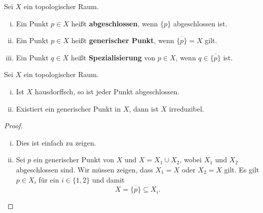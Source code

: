 \begin{defn}
	Sei $X$ ein topologischer Raum.
	\begin{enumerate}[i)]
		\item Ein Punkt $p \in X$ heißt \textbf{abgeschlossen}, wenn $\{p\}$ abgeschlossen ist.
		\item Ein Punkt $p \in X$ heißt \textbf{generischer Punkt}, wenn $\overline{\{p\}} = X$ gilt.
		\item Ein Punkt $q \in X$ heißt \textbf{Spezialisierung} von $p \in X$, wenn $q \in \overline{\{p\}}$ ist.
	\end{enumerate}
\end{defn}

\begin{lem}
	Sei $X$ ein topologischer Raum.
	\begin{enumerate}[i)]
		\item Ist $X$ hausdorffsch, so ist jeder Punkt abgeschlossen.
		\item Existiert ein generischer Punkt in $X$, dann ist $X$ irreduzibel.
	\end{enumerate}
	\begin{proof}
		\begin{enumerate}[i)]
			\item Dies ist einfach zu zeigen.
			\item Sei $p$ ein generischer Punkt von $X$ und $X = X_1 \cup X_2$, wobei $X_1$ und $X_2$ abgeschlossen sind. Wir müssen zeigen, dass $X_1=X$ oder $X_2=X$ gilt. Es gilt $p \in X_i$ für ein $i \in \{1,2\}$ und damit
			\[
				X = \overline{\{p\}} \subseteq X_i.
			\]
		\end{enumerate}
	\end{proof}
\end{lem}


